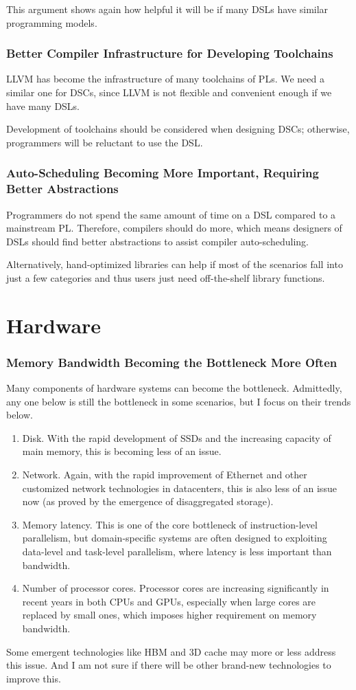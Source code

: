 \documentclass[11pt]{article}
\begin{document}
This argument shows again how helpful it will be if many DSLs have similar programming models.
\subsubsection*{Better Compiler Infrastructure for Developing Toolchains}
LLVM has become the infrastructure of many toolchains of PLs.
We need a similar one for DSCs, since LLVM is not flexible and convenient enough if we have many DSLs.

Development of toolchains should be considered when designing DSCs; otherwise, programmers will be reluctant to use the DSL.

\subsubsection*{Auto-Scheduling Becoming More Important, Requiring Better Abstractions}
Programmers do not spend the same amount of time on a DSL compared to a mainstream PL.
Therefore, compilers should do more, which means designers of DSLs should find better abstractions to assist compiler auto-scheduling.

Alternatively, hand-optimized libraries can help if most of the scenarios fall into just a few categories and thus users just need off-the-shelf library functions.
\section{Hardware}
\subsubsection*{Memory Bandwidth Becoming the Bottleneck More Often}
Many components of hardware systems can become the bottleneck.
Admittedly, any one below is still the bottleneck in some scenarios, but I focus on their trends below.
\begin{enumerate}
    \item Disk.
    With the rapid development of SSDs and the increasing capacity of main memory, this is becoming less of an issue.
    \item Network.
    Again, with the rapid improvement of Ethernet and other customized network technologies in datacenters, this is also less of an issue now (as proved by the emergence of disaggregated storage).
    \item Memory latency.
    This is one of the core bottleneck of instruction-level parallelism, but domain-specific systems are often designed to exploiting data-level and task-level parallelism, where latency is less important than bandwidth.
    \item Number of processor cores.
    Processor cores are increasing significantly in recent years in both CPUs and GPUs, especially when large cores are replaced by small ones, which imposes higher requirement on memory bandwidth.
\end{enumerate}
Some emergent technologies like HBM and 3D cache may more or less address this issue.
And I am not sure if there will be other brand-new technologies to improve this.
\end{document}
